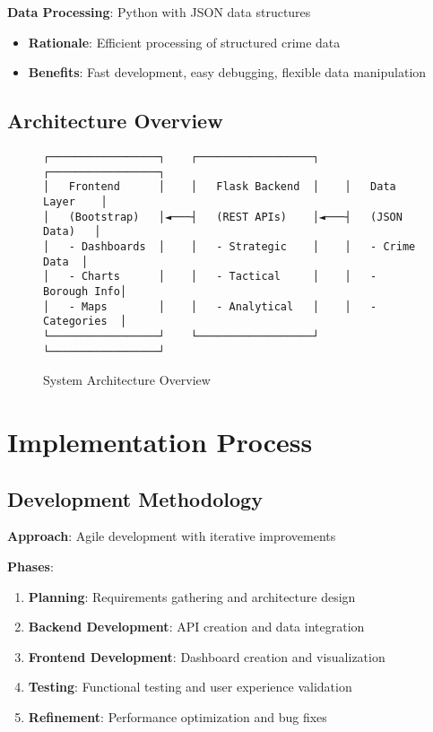 \documentclass[12pt,a4paper]{article}
\begin{document}
\textbf{Data Processing}: Python with JSON data structures
\begin{itemize}
    \item \textbf{Rationale}: Efficient processing of structured crime data
    \item \textbf{Benefits}: Fast development, easy debugging, flexible data manipulation
\end{itemize}

\subsection{Architecture Overview}

\begin{figure}[h]
\centering
\begin{verbatim}
┌─────────────────┐    ┌──────────────────┐    ┌─────────────────┐
│   Frontend      │    │   Flask Backend  │    │   Data Layer    │
│   (Bootstrap)   │◄───┤   (REST APIs)    │◄───┤   (JSON Data)   │
│   - Dashboards  │    │   - Strategic    │    │   - Crime Data  │
│   - Charts      │    │   - Tactical     │    │   - Borough Info│
│   - Maps        │    │   - Analytical   │    │   - Categories  │
└─────────────────┘    └──────────────────┘    └─────────────────┘
\end{verbatim}
\caption{System Architecture Overview}
\end{figure}

\section{Implementation Process}

\subsection{Development Methodology}

\textbf{Approach}: Agile development with iterative improvements

\textbf{Phases}:
\begin{enumerate}
    \item \textbf{Planning}: Requirements gathering and architecture design
    \item \textbf{Backend Development}: API creation and data integration
    \item \textbf{Frontend Development}: Dashboard creation and visualization
    \item \textbf{Testing}: Functional testing and user experience validation
    \item \textbf{Refinement}: Performance optimization and bug fixes
\end{enumerate}
\end{document}
